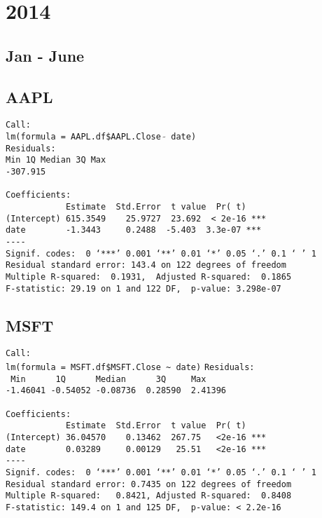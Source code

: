 \documentclass{article}[14pt]
\begin{document}
\section{ 2014}

\subsection{Jan - June}
\subsection{AAPL}

\texttt{Call: \\
lm(formula = AAPL.df\$AAPL.Close  $\tilde{}$ date)\\
Residuals:\\
Min \hspace{35pt} 1Q \qquad Median \qquad 3Q \qquad  Max\\
-307.915       \\}
\verb| |\\
\verb|Coefficients:|\\
\verb|            Estimate  Std.Error  t value  Pr( t)|\\
\verb|(Intercept) 615.3549    25.9727  23.692  < 2e-16 ***|\\
\verb|date        -1.3443     0.2488  -5.403  3.3e-07 ***|\\
\verb|----|\\
\verb|Signif. codes:  0 ‘***’ 0.001 ‘**’ 0.01 ‘*’ 0.05 ‘.’ 0.1 ‘ ’ 1|\\
\verb|Residual standard error: 143.4 on 122 degrees of freedom|\\
\verb|Multiple R-squared:  0.1931,	Adjusted R-squared:  0.1865 |\\
\verb|F-statistic: 29.19 on 1 and 122 DF,  p-value: 3.298e-07|

\subsection{MSFT}
\verb|Call:|\\
\verb|lm(formula = MSFT.df$MSFT.Close ~ date)|
\verb|Residuals:|\\
\verb| Min      1Q      Median      3Q     Max |\\
\verb|-1.46041 -0.54052 -0.08736  0.28590  2.41396 |\\
\verb| |\\
\verb|Coefficients:|\\
\verb|            Estimate  Std.Error  t value  Pr( t)|\\
\verb|(Intercept) 36.04570    0.13462  267.75   <2e-16 ***|\\
\verb|date        0.03289     0.00129   25.51   <2e-16 ***|\\
\verb|----|\\
\verb|Signif. codes:  0 ‘***’ 0.001 ‘**’ 0.01 ‘*’ 0.05 ‘.’ 0.1 ‘ ’ 1|\\
\verb|Residual standard error: 0.7435 on 122 degrees of freedom|\\
\verb|Multiple R-squared:   0.8421,	Adjusted R-squared:  0.8408|\\
\verb|F-statistic: 149.4 on 1 and 125 DF,  p-value: < 2.2e-16|
\end{document}
